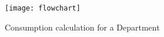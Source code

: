 \begin{figure}[H]
    \centering
    \texttt{[image: flowchart]}
    \caption{Consumption calculation for a Department}
    \label{fig:consumption_flowchart}
\end{figure}